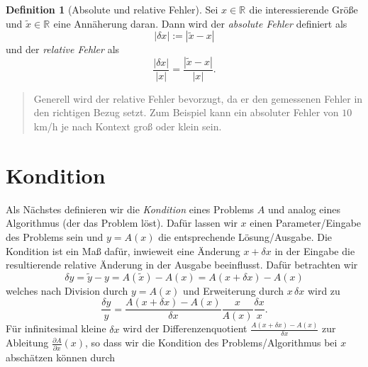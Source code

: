 \documentclass[
]{book}
\newenvironment {JHSAYS} [0] {\begin{quote}\color{jhsc}} {\end{quote}}
\theoremstyle{definition}
\newtheorem{definition}{Definition}[chapter]
\theoremstyle{definition}
\theoremstyle{definition}
\theoremstyle{definition}
\theoremstyle{remark}
\begin{document}
\begin{definition}[Absolute und relative Fehler]
\protect\hypertarget{def:errors}{}\label{def:errors}Sei \(x\in\mathbb R^{}\) die interessierende Größe und \(\tilde x \in \mathbb R^{}\) eine Annäherung daran. Dann wird der \emph{absolute Fehler} definiert als
\begin{equation*}
|\delta x|:=|\tilde x- x|
\end{equation*}
und der \emph{relative Fehler} als
\begin{equation*}
\frac{|\delta x|}{|x|}=\frac{|\tilde x- x|}{|x|}.
\end{equation*}
\end{definition}

\leavevmode{}%
\begin{JHSAYS}
Generell wird der relative Fehler bevorzugt, da er den gemessenen Fehler in den richtigen Bezug setzt. Zum Beispiel kann ein absoluter Fehler von \(10\) km/h je nach Kontext groß oder klein sein.

\end{JHSAYS}

\hypertarget{kondition}{%
\section{Kondition}\label{kondition}}

Als Nächstes definieren wir die \emph{Kondition} eines Problems \(A\) und analog eines Algorithmus (der das Problem löst). Dafür lassen wir \(x\) einen Parameter/Eingabe des Problems sein und \(y=A(x)\) die entsprechende Lösung/Ausgabe. Die Kondition ist ein Maß dafür, inwieweit eine Änderung \(x+\delta x\) in der Eingabe die resultierende relative Änderung in der Ausgabe beeinflusst. Dafür betrachten wir
\begin{equation*}
\delta y = \tilde y - y = A(\tilde x) - A(x) = A(x+\delta x) - A(x)
\end{equation*}
welches nach Division durch \(y=A(x)\) und Erweiterung durch \(x\,\delta x\) wird zu
\begin{equation*}
\frac{\delta y}{y} = \frac{A(x+\delta x)-A(x)}{\delta x}\frac{x}{A(x)}\frac{\delta x}{x}.
\end{equation*}
Für infinitesimal kleine \(\delta x\) wird der Differenzenquotient \(\frac{A(x+\delta x)-A(x)}{\delta x}\) zur Ableitung \(\frac{\partial A}{\partial x}(x)\), so dass wir die Kondition des Problems/Algorithmus bei \(x\) abschätzen können durch
\end{document}
